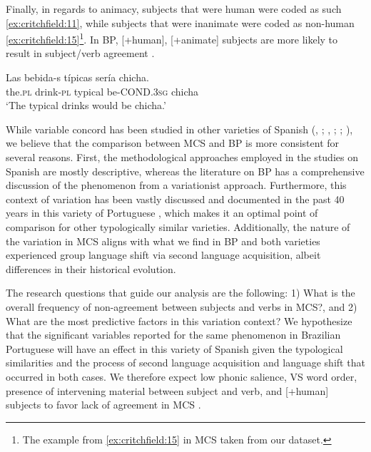 \documentclass[output=paper,colorlinks,citecolor=brown,
]{langscibook}
\begin{document}
Finally, in regards to animacy, subjects that were human were coded as such \ref{ex:critchfield:11}, while subjects that were inanimate were coded as non-human \ref{ex:critchfield:15}\footnote{The example from \ref{ex:critchfield:15} in MCS taken from our dataset.}. In BP, [+human], [+animate] subjects are more likely to result in subject/verb agreement \citep[363]{mendes2015variable}.


\begin{exe}
    \ex\label{ex:critchfield:15}
     \gll Las bebida-s típicas sería chicha. \\
       the.\textsc{pl} drink-\textsc{pl} typical be-COND.\textsc{3sg} chicha\\
            \glt  `The typical drinks would be chicha.'\\
\end{exe}

While variable concord has been studied in other varieties of Spanish (\citealt{lipski2008a}, \citeyear{lipski2008b}; \citealt{sessarego2011status}, \citeyear{sessarego2012non}; \citealt{foote2012role}; \citealt{guy2017african}), we believe that the comparison between MCS and BP is more consistent for several reasons. First, the methodological approaches employed in the studies on Spanish are mostly descriptive, whereas the literature on BP has a comprehensive discussion of the phenomenon from a variationist approach. Furthermore, this context of variation has been vastly discussed and documented in the past 40 years in this variety of Portuguese \citep[358]{mendes2015variable}, which makes it an optimal point of comparison for other typologically similar varieties. Additionally, the nature of the variation in MCS aligns with what we find in BP and both varieties experienced group language shift via second language acquisition, albeit differences in their historical evolution.

The research questions that guide our analysis are the following: 1) What is the overall frequency of non-agreement between subjects and verbs in MCS?, and 2) What are the most predictive factors in this variation context? We hypothesize that the significant variables reported for the same phenomenon in Brazilian Portuguese will have an effect in this variety of Spanish given the typological similarities and the process of second language acquisition and language shift that occurred in both cases. We therefore expect low phonic salience, VS word order, presence of intervening material between subject and verb, and [+human] subjects to favor lack of agreement in MCS \citep{naro2000variable}. 
\end{document}
